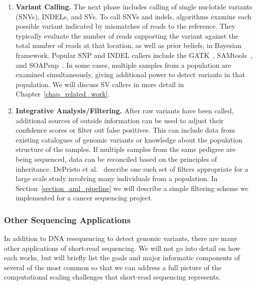\begin{enumerate}
\item \textbf{Variant Calling.} The next phase includes calling of single nuclotide variants (SNVs), INDELs, and SVs. To call SNVs and indels, algorithms examine each possible variant indicated by mismatches of reads to the reference. They typically evaluate the number of reads supporting the variant against the total number of reads at that location, as well as prior beliefs, in Bayesian framework. Popular SNP and INDEL callers include the GATK~\cite{McKenna:2010p1051}, SAMtools~\cite{Li:2009vz}, and SOAPsnp~\cite{Li:2009p1236}. In some cases, multiple samples from a population are examined simultaneously, giving additional power to detect variants in that population. We will discuss SV callers in more detail in Chapter~\ref{chap_related_work}.

\item \textbf{Integrative Analysis/Filtering.} After raw variants have been called, additional sources of outside information can be used to adjust their confidence scores or filter out false positives. This can include data from existing catalogues of genomic variants or knowledge about the population structure of the samples. If multiple samples from the same pedigree are being sequenced, data can be reconciled based on the principles of inheritance. DePristo et al.~\cite{DePristo:2011fo} describe one such set of filters appropriate for a large scale study involving many individuals from a population. In Section~\ref{section_aml_pipeline} we will describe a simple filtering scheme we implemented for a cancer sequencing project.

\end{enumerate}

\subsubsection{Other Sequencing Applications}

In addition to DNA resequencing to detect genomic variants, there are many other applications of short-read sequencing. We will not go into detail on how each works, but will briefly list the goals and major informatic components of several of the most common so that we can address a full picture of the computational scaling challenges that short-read sequencing represents. 

